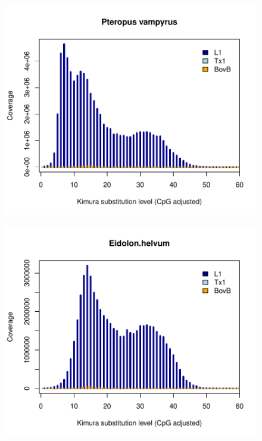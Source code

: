\documentclass[12pt,a4paper,times]{article}
\begin{document}
\begin{figure}[H]
	\centering
	\includegraphics[scale=0.8]{suppFigures/divergencePlots/Pteropus_vampyrus.pdf}
	\caption{\label{Pteropus_vampyrus}}
\end{figure}

\begin{figure}[H]
	\centering
	\includegraphics[scale=0.8]{suppFigures/divergencePlots/Eidolon_helvum.pdf}
	\caption{\label{Eidolon_helvum}}
\end{figure}
\end{document}
